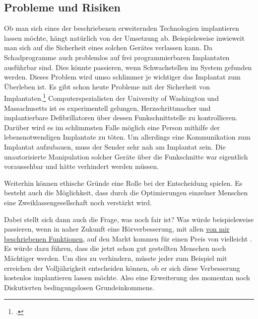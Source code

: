 \subsection{Probleme und Risiken}
\label{sec:Robin:future:problems}
Ob man sich eines der beschriebenen erweiternden Technologien implantieren lassen möchte, hängt
natürlich von der Umsetzung ab. Beispielsweise inwieweit man sich auf die Sicherheit eines solchen
Gerätes verlassen kann. Da Schadprogramme auch problemlos auf frei programmierbaren Implantaten
ausführbar sind. Dies könnte passieren, wenn Schwachstellen im System gefunden werden. Dieses Problem
wird umso schlimmer je wichtiger das Implantat zum Überleben ist. Es gibt schon heute Probleme mit
der Sicherheit von Implantaten.\footcite{Heise:Pacemaker_Hacker, MIT:Protect_implants_from_attack}
Computerspezialisten der University of Washington und Massachusetts ist es experimentell gelungen,
Herzschrittmacher und implantierbare Defibrillatoren über dessen Funkschnittstelle zu kontrollieren.
Darüber wird es im schlimmsten Falle möglich eine Person mithilfe der lebensnotwendigen Implantate zu
töten. Um allerdings eine Kommunikation zum Implantat aufzubauen, muss der Sender sehr nah am
Implantat sein.
Die unautorisierte Manipulation solcher Geräte über die Funkschnitte war eigentlich voraussehbar und
hätte verhindert werden müssen.

Weiterhin können ethische Gründe eine Rolle bei der Entscheidung spielen. Es besteht auch die
Möglichkeit, dass durch die Optimierungen einzelner Menschen eine Zweiklassengesellschaft noch
verstärkt wird.

Dabei stellt sich dann auch die Frage, was noch fair ist? Was würde beispielsweise passieren, wenn in
naher Zukunft eine Hörverbesserung, mit allen \hyperref[sec:Robin:future:hearing]{von mir
beschriebenen Funktionen}, auf den Markt kommen für einen Preis von vielleicht . Es würde
dazu führen, dass die jetzt schon gut gestellten Menschen noch Mächtiger werden. Um dies zu
verhindern, müsste jeder zum Beispiel mit erreichen der Volljährigkeit entscheiden können, ob er sich
diese Verbesserung kostenlos implantieren lassen möchte. Also eine Erweiterung des momentan noch
Diskutierten bedingungslosen Grundeinkommens.

\begin{comment}
Eine weitere Frage ist, bis wann wir noch als Menschen zählen?
„Ist man noch ein Mensch, wenn man den Teil im Gehirn abgeschaltet hat, der für Schuldgefühle
zuständig ist?“\footcite{23C3:body_hacking}
\end{comment}

